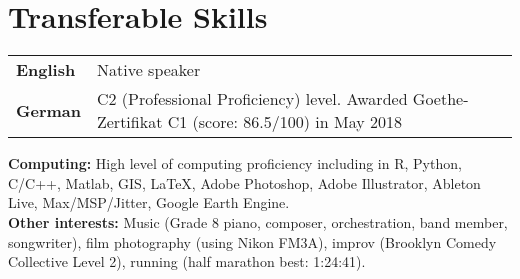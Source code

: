 \section*{Transferable Skills}


\begin{center}
\begin{tabular}{ l l }
\textbf{English}  & Native speaker\\ 
\textbf{German} & C2 (Professional Proficiency) level. Awarded Goethe-Zertifikat C1 (score: 86.5/100) in May 2018\\ 
\end{tabular}
\end{center}


\noindent \textbf{Computing:} High level of computing proficiency including in R, Python, C/C++, Matlab, GIS, \LaTeX, Adobe Photoshop, Adobe Illustrator, Ableton Live, Max/MSP/Jitter, Google Earth Engine.\\

\noindent \textbf{Other interests:} Music (Grade 8 piano, composer, orchestration, band member, songwriter), film photography (using Nikon FM3A), improv (Brooklyn Comedy Collective Level 2), running (half marathon best: 1:24:41).



